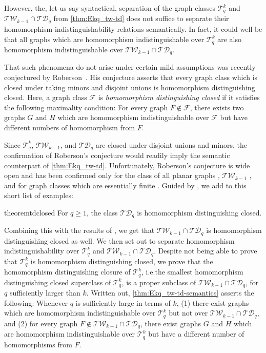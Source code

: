 \documentclass[a4paper,UKenglish,cleveref, autoref, thm-restate]{lipics-v2021}
\newcommand{\TW}{\ensuremath{\mathcal{TW}}}
\newcommand{\TD}{\ensuremath{\mathcal{TD}}}
\newcommand{\Ekq}{\ensuremath{\mathcal{T}_{q}^{k}}}
\begin{document}
However, the, let us say syntactical, separation of the graph classes $\Ekq$ and $\mathcal{TW}_{k-1} \cap \mathcal{TD}_q$ from \cref{thm:Ekq_tw-td} does not suffice to separate their homomorphism indistinguishability relations semantically. In fact, it could well be that all graphs which are homomorphism indistinguishable over $\Ekq$ are also homomorphism indistinguishable over $\mathcal{TW}_{k-1} \cap \mathcal{TD}_q$.

That such phenomena do not arise under certain mild assumptions was recently conjectured by Roberson~\cite{roberson_oddomorphisms_2022}. His conjecture asserts that every graph class which is closed under taking minors and disjoint unions is homomorphism distinguishing closed. Here, a graph class $\mathcal{F}$ is \emph{homomorphism distinguishing closed} if it satisfies the following maximality condition: For every graph $F \not\in \mathcal{F}$, there exists two graphs $G$ and $H$ which are homomorphism indistinguishable over $\mathcal{F}$ but have different numbers of homomorphism from $F$.

Since $\Ekq$, $\mathcal{TW}_{k-1}$, and $\mathcal{TD}_q$ are closed under disjoint unions and minors, the confirmation of Roberson's conjecture would readily imply the semantic counterpart of \cref{thm:Ekq_tw-td}. Unfortunately, Roberson's conjecture is wide open and has been confirmed only for the class of all planar graphs \cite{roberson_oddomorphisms_2022}, $\mathcal{TW}_{k-1}$ \cite{neuen_homomorphism-distinguishing_2023}, and for graph classes which are essentially finite \cite{seppelt_logical_2023}. Guided by \cite{neuen_homomorphism-distinguishing_2023}, we add to this short list of examples:

\begin{restatable}{theorem}{tdclosed}
	\label{thm:td-closed}
	For $q \geq 1$, the class $\mathcal{TD}_q$ is homomorphism distinguishing closed.
\end{restatable}

Combining this with the results of \cite{neuen_homomorphism-distinguishing_2023}, we get that $\TW_{k-1}\cap\TD_q$ is homomorphism distinguishing closed as well.
We then set out to separate homomorphism indistinguishability over $\Ekq$ and $\TW_{k-1}\cap\TD_q$.
Despite not being able to prove that $\Ekq$ is homomorphism distinguishing closed, we prove that the homomorphism distinguishing closure of $\Ekq$, i.e.\@ the smallest homomorphism distinguishing closed superclass of $\Ekq$, is a proper subclass of $\TW_{k-1}\cap\TD_q$, for $q$ sufficiently larger than $k$.
Written out, \cref{thm:Ekq_tw-td-semantics} asserts the following:
Whenever $q$ is sufficiently large in terms of $k$,
(1) there exist graphs which are homomorphism indistinguishable over $\Ekq$ but not over $\TW_{k-1}\cap\TD_q$, and
(2) for every graph $F \not\in \mathcal{TW}_{k-1} \cap \mathcal{TD}_q$, there exist graphs $G$ and $H$ which are homomorphism indistinguishable over $\Ekq$ but have a different number of homomorphisms from $F$.
\end{document}
